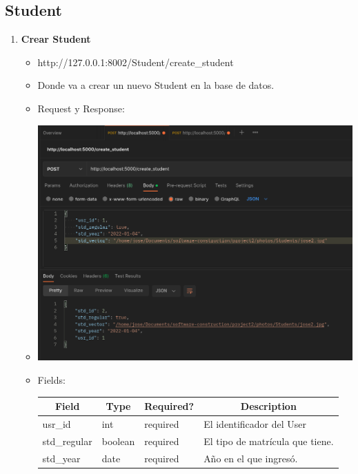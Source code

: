 \documentclass{article}
\begin{document}
\subsection{Student}
\begin{enumerate}
    \item \textbf{Crear Student}
    \begin{itemize}
        \item http://127.0.0.1:8002/Student/create\_student
        \item Donde va a crear un nuevo Student en la base de datos.
        \item Request y Response:
        \item \includegraphics[scale=.5]{assets/student/create.png}
        \item Fields:
        \begin{table}[H] \centering \begin{tabular}{|l|l|l|l|} \hline
        \multicolumn{1}{|c|}{\textbf{Field}} &
        \multicolumn{1}{c|}{\textbf{Type}} &
        \multicolumn{1}{c|}{\textbf{Required?}} &
        \multicolumn{1}{c|}{\textbf{Description}} \\ \hline usr\_id & int &
        required & El identificador del User \\ \hline std\_regular & boolean &
        required & El tipo de matrícula que tiene. \\ \hline std\_year & date &
        required & Año en el que ingresó. \\ \hline \end{tabular} \end{table}

\end{itemize}
\end{enumerate}
\end{document}

